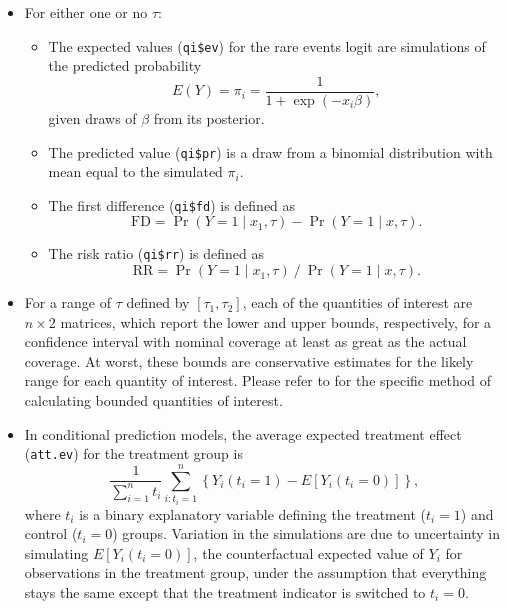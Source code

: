 \begin{itemize}
\item For either one or no $\tau$:  
  \begin{itemize}
  \item The expected values ({\tt qi\$ev}) for the rare events logit
    are simulations of the predicted probability $$E(Y) = \pi_i =
    \frac{1}{1 + \exp(-x_i \beta)},$$
    given draws of $\beta$ from its posterior.
  \item The predicted value ({\tt qi\$pr}) is a draw from a binomial
    distribution with mean equal to the simulated $\pi_i$.  
  \item The first difference ({\tt qi\$fd}) is defined as
   \begin{equation*}
   \textrm{FD} = \Pr(Y = 1 \mid x_1, \tau) - \Pr(Y = 1 \mid x, \tau).
   \end{equation*}
  \item The risk ratio ({\tt qi\$rr}) is defined as
   \begin{equation*}
   \textrm{RR} = \Pr(Y = 1 \mid x_1, \tau) \ / \ \Pr(Y = 1 \mid x, \tau).
   \end{equation*}
   \end{itemize}
 \item For a range of $\tau$ defined by $[\tau_1, \tau_2]$, each of
   the quantities of interest are $n \times 2$ matrices, which report
   the lower and upper bounds, respectively, for a confidence interval
   with nominal coverage at least as great as the actual coverage.  At
   worst, these bounds are conservative estimates for the likely range
   for each quantity of interest.  Please refer to \nocite{KinZen02b}
   for the specific method of calculating bounded quantities of
   interest.

\item In conditional prediction models, the average expected treatment
  effect ({\tt att.ev}) for the treatment group is 
    \begin{equation*} \frac{1}{\sum_{i=1}^n t_i}\sum_{i:t_i=1}^n \left\{ Y_i(t_i=1) -
      E[Y_i(t_i=0)] \right\},
    \end{equation*} 
    where $t_i$ is a binary explanatory variable defining the treatment
    ($t_i=1$) and control ($t_i=0$) groups.  Variation in the
    simulations are due to uncertainty in simulating $E[Y_i(t_i=0)]$,
    the counterfactual expected value of $Y_i$ for observations in the
    treatment group, under the assumption that everything stays the
    same except that the treatment indicator is switched to $t_i=0$.


\end{itemize}
